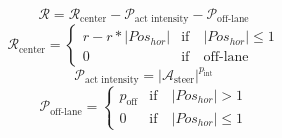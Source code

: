 \begin{equation*}
    \mathcal{R} = \mathcal{R}_{\textrm{center}} - \mathcal{P}_{\textrm{act intensity}} - \mathcal{P}_{\textrm{off-lane}}
\end{equation*}
\begin{equation*}
    \mathcal{R}_{\textrm{center}} = 
    \begin{cases}
        r - r * |Pos_{hor}| & \text{if} \quad |Pos_{hor}| \leq 1 \\
        0 & \text{if} \quad \text{off-lane}
    \end{cases}
\end{equation*}
\begin{equation*}
    \mathcal{P}_{\textrm{act intensity}} = |\mathcal{A}_{\textrm{steer}}| ^ {p_{\textrm{int}}}
\end{equation*}
\begin{equation*}
    \mathcal{P}_{\textrm{off-lane}} = 
    \begin{cases}
        p_{\textrm{off}} & \text{if} \quad |Pos_{hor}| > 1 \\
        0 & \text{if} \quad |Pos_{hor}| \leq 1
    \end{cases}
\end{equation*}